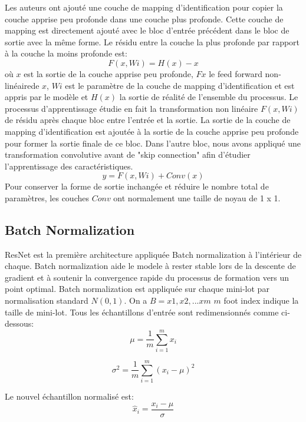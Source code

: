 \documentclass{article}
\begin{document}
Les auteurs ont ajouté une couche de mapping d'identification pour copier la couche apprise peu profonde dans une couche plus profonde. Cette couche de mapping est directement ajouté avec le bloc d'entrée précédent dans le bloc de sortie avec la même forme.
Le résidu entre la couche la plus profonde par rapport à la couche la moins profonde est:
\begin{equation}
   F(x,Wi) = H(x) - x
\end{equation}
où $x$ est la sortie de la couche apprise peu profonde, $Fx$ le feed forward non-linéairede $x$, $Wi$ est le paramètre de la couche de mapping d'identification et est appris par le modèle et $H(x)$ la sortie de réalité de l'ensemble du processus.
Le processus d'apprentissage étudie en fait la transformation non linéaire $F(x,Wi)$ de résidu après chaque bloc entre l'entrée et la sortie.
La sortie de la couche de mapping d'identification est ajoutée à la sortie de la couche apprise peu profonde pour former la sortie finale de ce bloc.
Dans l'autre bloc, nous avons appliqué une transformation convolutive avant de "skip connection" afin d'étudier l'apprentissage des caractéristiques.
\begin{equation}
    y = F(x,Wi) +Conv(x)
\end{equation}
Pour conserver la forme de sortie inchangée et réduire le nombre total de paramètres, les couches $Conv$ ont normalement une taille de noyau de 1 x 1.
\subsection{Batch Normalization}
ResNet est la première architecture appliquée Batch normalization à l'intérieur de chaque. Batch normalization aide le modele à rester stable lors de la descente de gradient et à soutenir la convergence rapide du processus de formation vers un point optimal.
Batch normalization est appliquée sur chaque mini-lot par normalisation standard $N(0,1)$. On a $B=x1,x2,...xm$ $m$ foot index indique la taille de mini-lot. Tous les échantillons d'entrée sont redimensionnés comme ci-dessous:
\begin{equation}
    \mu = \frac{1}{m}\sum_{i=1}^{m}x_{i}
\end{equation}

\begin{equation}
    \sigma^{2} = \frac{1}{m}\sum_{i=1}^{m}(x_{i} - \mu)^{2}
\end{equation}

Le nouvel échantillon normalisé est:
\begin{equation}
    \hat{x}_{i} = \frac{x_{i} - \mu}{\sigma}
\end{equation}
\end{document}
